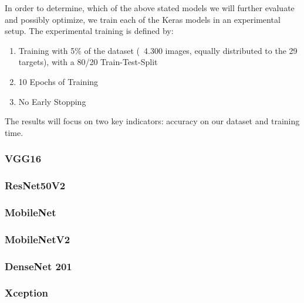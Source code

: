 In order to determine, which of the above stated models we will further evaluate and possibly optimize, we train each of the Keras models in an experimental setup. The experimental training is defined by:
\begin{enumerate}
    \item Training with 5\% of the dataset (~4.300 images, equally distributed to the 29 targets), with a 80/20 Train-Test-Split
    \item 10 Epochs of Training
    \item No Early Stopping
\end{enumerate}

The results will focus on two key indicators: accuracy on our dataset and training time.

\subsubsection{VGG16}

\subsubsection{ResNet50V2}

\subsubsection{MobileNet}

\subsubsection{MobileNetV2}

\subsubsection{DenseNet 201}

\subsubsection{Xception}